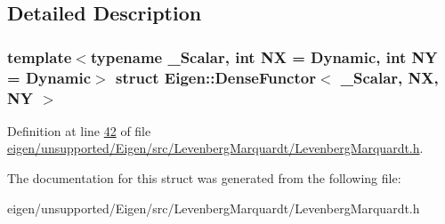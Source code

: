 \subsection{Detailed Description}
\subsubsection*{template$<$typename \+\_\+\+Scalar, int NX = Dynamic, int NY = Dynamic$>$\newline
struct Eigen\+::\+Dense\+Functor$<$ \+\_\+\+Scalar, N\+X, N\+Y $>$}



Definition at line \hyperlink{eigen_2unsupported_2_eigen_2src_2_levenberg_marquardt_2_levenberg_marquardt_8h_source_l00042}{42} of file \hyperlink{eigen_2unsupported_2_eigen_2src_2_levenberg_marquardt_2_levenberg_marquardt_8h_source}{eigen/unsupported/\+Eigen/src/\+Levenberg\+Marquardt/\+Levenberg\+Marquardt.\+h}.



The documentation for this struct was generated from the following file\+:\begin{DoxyCompactItemize}
\item 
eigen/unsupported/\+Eigen/src/\+Levenberg\+Marquardt/\+Levenberg\+Marquardt.\+h\end{DoxyCompactItemize}
